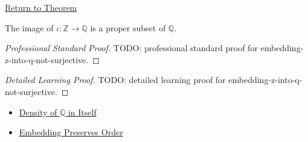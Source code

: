 \newpage
{}
\label{prf:embedding-z-into-q-not-surjective}

\begin{remark*}[Return]
\hyperref[cor:embedding-z-into-q-not-surjective]{Return to Theorem}
\end{remark*}

\begin{corollary*}
The image of $\iota:\mathbb{Z}\to\mathbb{Q}$ is a proper subset of
\(\mathbb{Q}\).
\end{corollary*}

\begin{proof}[Professional Standard Proof]
\LRAProofBodyStart
TODO: professional standard proof for embedding-z-into-q-not-surjective.
\end{proof}

\begin{proof}[Detailed Learning Proof]
\LRAProofBodyStart
TODO: detailed learning proof for embedding-z-into-q-not-surjective.
\end{proof}

\begin{remark*}
\end{remark*}

\begin{dependencies}
\begin{itemize}
  \item \hyperref[thm:density-of-q]{Density of $\mathbb{Q}$ in Itself}
  \item \hyperref[thm:embedding-z-into-q-preserves-order]{Embedding Preserves Order}
\end{itemize}
\end{dependencies}

\clearpage
